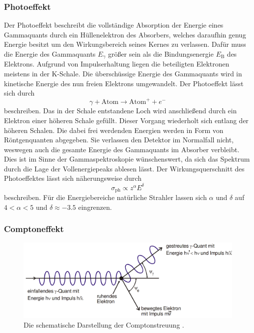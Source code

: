 \subsubsection{Photoeffekt}
Der Photoeffekt beschreibt die vollständige Absorption der Energie eines Gammaquants durch ein Hüllenelektron des Absorbers, welches daraufhin genug Energie besitzt um den Wirkungsbereich seines Kernes zu verlassen. Dafür muss die Energie des Gammaquants $E_\gamma$ größer sein als die Bindungsenergie $E_\text{B}$ des Elektrons. Aufgrund von Impulserhaltung liegen die beteiligten Elektronen meistens in der K-Schale. Die überschüssige Energie des Gammaquants wird in kinetische Energie des nun freien Elektrons umgewandelt. Der Photoeffekt lässt sich durch 
\begin{equation}
    \gamma + \text{Atom} \to \text{Atom}^+ + e^-
\end{equation}
beschreiben. Das in der Schale entstandene Loch wird anschließend durch ein Elektron einer höheren Schale gefüllt. Dieser Vorgang wiederholt sich entlang der höheren Schalen.
Die dabei frei werdenden Energien werden in Form von Röntgenquanten abgegeben. Sie verlassen den Detektor im Normalfall nicht, weswegen auch die gesamte Energie des Gammaquants im Absorber verbleibt. Dies ist im Sinne der Gammaspektroskopie wünschenswert, da sich das Spektrum durch die Lage der Vollenergiepeaks ablesen lässt.
Der Wirkungsquerschnitt des Photoeffektes lässt sich näherungsweise durch
\begin{equation}
    \sigma_\text{ph} \propto z^\alpha E^\delta \label{eq:sigp}
\end{equation}
beschreiben. Für die Energiebereiche natürliche Strahler lassen sich $\alpha$ und $\delta$ auf $4 < \alpha <5 $ und $\delta \approx -3.5$ eingrenzen. 

\subsubsection{Comptoneffekt}

\begin{figure}
	\centering
	\includegraphics[width=\linewidth-100pt,height=\textheight-100pt,keepaspectratio]{content/Images/compton.png}
    \caption{Die schematische Darstellung der Comptonstreuung  \cite{V18}.}
    \label{fig:compton}
\end{figure}

